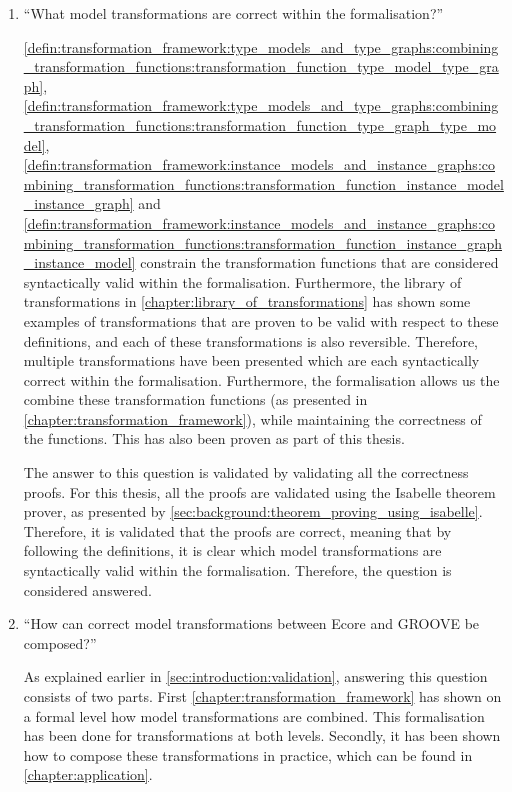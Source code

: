 \begin{enumerate}
    \item ``What model transformations are correct within the formalisation?''
    
    \cref{defin:transformation_framework:type_models_and_type_graphs:combining_transformation_functions:transformation_function_type_model_type_graph}, \cref{defin:transformation_framework:type_models_and_type_graphs:combining_transformation_functions:transformation_function_type_graph_type_model}, \cref{defin:transformation_framework:instance_models_and_instance_graphs:combining_transformation_functions:transformation_function_instance_model_instance_graph} and \cref{defin:transformation_framework:instance_models_and_instance_graphs:combining_transformation_functions:transformation_function_instance_graph_instance_model} constrain the transformation functions that are considered syntactically valid within the formalisation. Furthermore, the library of transformations in \cref{chapter:library_of_transformations} has shown some examples of transformations that are proven to be valid with respect to these definitions, and each of these transformations is also reversible. Therefore, multiple transformations have been presented which are each syntactically correct within the formalisation. Furthermore, the formalisation allows us the combine these transformation functions (as presented in \cref{chapter:transformation_framework}), while maintaining the correctness of the functions. This has also been proven as part of this thesis.
    
    The answer to this question is validated by validating all the correctness proofs. For this thesis, all the proofs are validated using the Isabelle theorem prover, as presented by \cref{sec:background:theorem_proving_using_isabelle}. Therefore, it is validated that the proofs are correct, meaning that by following the definitions, it is clear which model transformations are syntactically valid within the formalisation. Therefore, the question is considered answered.
    
    \item ``How can correct model transformations between Ecore and GROOVE be composed?''
    
    As explained earlier in \cref{sec:introduction:validation}, answering this question consists of two parts. First \cref{chapter:transformation_framework} has shown on a formal level how model transformations are combined. This formalisation has been done for transformations at both levels. Secondly, it has been shown how to compose these transformations in practice, which can be found in \cref{chapter:application}.
    

\end{enumerate}
